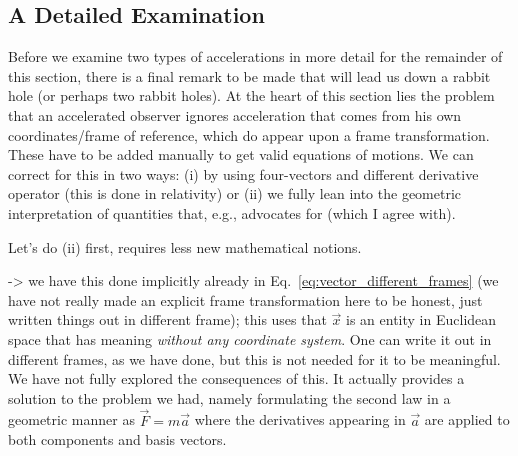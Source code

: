 \documentclass[../class_mech_main.tex]{subfiles}
\begin{document}





		\subsection{A Detailed Examination}

Before we examine two types of accelerations in more detail for the remainder of this section, there is a final remark to be made that will lead us down a rabbit hole (or perhaps two rabbit holes). At the heart of this section lies the problem that an accelerated observer ignores acceleration that comes from his own coordinates/frame of reference, which do appear upon a frame transformation. These have to be added manually to get valid equations of motions. We can correct for this in two ways: (i) by using four-vectors and different derivative operator (this is done in relativity) or (ii) we fully lean into the geometric interpretation of quantities that, e.g., \cite{Thorne_2017} advocates for (which I agree with).


Let's do (ii) first, requires less new mathematical notions. 

-> we have this done implicitly already in Eq.~\eqref{eq:vector_different_frames} (we have not really made an explicit frame transformation here to be honest, just written things out in different frame); this uses that $\vec{x}$ is an entity in Euclidean space that has meaning \emph{without any coordinate system}. One can write it out in different frames, as we have done, but this is not needed for it to be meaningful. We have not fully explored the consequences of this. It actually provides a solution to the problem we had, namely formulating the second law in a geometric manner as $\vec{F} = m \vec{a}$ where the derivatives appearing in $\vec{a}$ are applied to both components and basis vectors.
\end{document}

